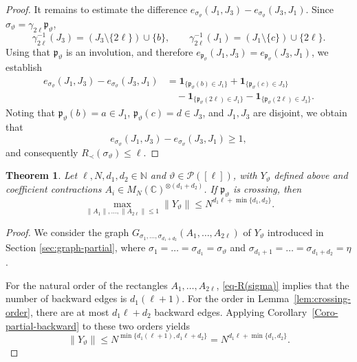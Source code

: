 \documentclass[12pt]{article}
\numberwithin{equation}{section}
\theoremstyle{plain}
\newtheorem{theorem}{Theorem}[section]
\def\bN{\mathbb N}
\def\bC{\mathbb C}
\def\cP{\mathcal P}
\begin{document}
\begin{proof}
It remains to estimate the difference $e_{\sigma_\vartheta}(J_1,J_3)-e_{\sigma_\vartheta}(J_3,J_1)$.
Since
$\sigma_\vartheta=\gamma_{2\ell} \mathfrak p_\vartheta$,
\[
 \gamma_{2\ell}^{-1}(J_3)=(J_3\setminus\{2\ell\})\cup\{b\},
 \qquad
 \gamma_{2\ell}^{-1}(J_1)=(J_1\setminus\{c\})\cup\{2\ell\}.
\]
Using that $\mathfrak p_\vartheta$ is an involution, and therefore
$e_{\mathfrak p_\vartheta}(J_1,J_3)=e_{\mathfrak p_\vartheta}(J_3,J_1)$, we establish
\begin{align*}
 e_{\sigma_\vartheta}(J_1,J_3)-e_{\sigma_\vartheta}(J_3,J_1)
 &=\mathbf 1_{\{\mathfrak p_\vartheta(b)\in J_1\}}+\mathbf 1_{\{\mathfrak p_\vartheta(c)\in J_3\}}\\
 &\quad-\mathbf 1_{\{\mathfrak p_\vartheta(2\ell)\in J_1\}}
       -\mathbf 1_{\{\mathfrak p_\vartheta(2\ell)\in J_3\}}.
\end{align*}
Noting that $\mathfrak p_\vartheta(b)=a\in J_1$, $\mathfrak p_\vartheta(c)=d\in J_3$, and $J_1,J_3$ are disjoint, we obtain that
\[
 e_{\sigma_\vartheta}(J_1,J_3)-e_{\sigma_\vartheta}(J_3,J_1)\geq1,
\]
and consequently $R_\prec(\sigma_\vartheta)\leq \ell$.
\end{proof}

\begin{theorem}\label{Thm-Ginibre-2}
Let $\ell,N,d_1,d_2\in\bN$ and $\vartheta\in\cP([\ell])$, with $Y_\vartheta$ defined above and coefficient contractions $A_i\in M_N(\bC)^{\otimes(d_1+d_2)}$. If $\mathfrak p_\vartheta$ is crossing, then
\[
\max_{\|A_1\|,\ldots,\|A_{2\ell}\|\le1}\|Y_\vartheta\|
\le N^{d_1\ell+\min\{d_1,d_2\}}.
\]
\end{theorem}

\begin{proof}
We consider the graph $G_{\sigma_1,\ldots,\sigma_{d_1+d_2}}(A_1,\ldots,A_{2\ell})$ of $Y_\vartheta$ introduced in Section \ref{sec:graph-partial}, where $\sigma_1=\ldots=\sigma_{d_1} = \sigma_\vartheta$ and $\sigma_{d_1+1} = \ldots = \sigma_{d_1+d_2} = \eta$.

For the natural order of the rectangles $A_1,\ldots,A_{2\ell}$, \eqref{eq-R(sigma)} implies that the number of backward edges is $d_1(\ell+1)$. For the order in Lemma~\ref{lem:crossing-order}, there are at most $d_1\ell+d_2$ backward edges. Applying Corollary~\ref{Coro-partial-backward} to these two orders yields
\[
\|Y_\vartheta\|\le
N^{\min\{d_1(\ell+1),d_1\ell+d_2\}}
=N^{d_1\ell+\min\{d_1,d_2\}}.
\]
\end{proof}
\end{document}
